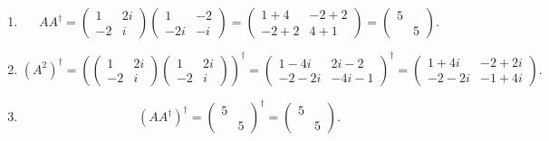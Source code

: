 \documentclass[11pt, letterpaper]{article}
\begin{document}
\begin{enumerate}
\[\begin{pmatrix}
			5 & -5i \\
			5i & 10
			\end{pmatrix}=\frac{1}{15} \begin{pmatrix}
			1 & -i \\
			i & 2
			\end{pmatrix}
		.\]
	\item 
		\[
			A A^{\dagger} =\begin{pmatrix}
			1 & 2i \\
			-2 & i
			\end{pmatrix}\begin{pmatrix}
			1 & -2 \\
			-2i & -i
			\end{pmatrix}=\begin{pmatrix}
			1+4 & -2+2 \\
			-2+2 & 4+1
			\end{pmatrix}=\begin{pmatrix}
			5 &  \\
			 & 5
			\end{pmatrix}
		.\]
	\item
		\[
			\left( A^2 \right) ^{\dagger} =\left( \begin{pmatrix}
			1 & 2i \\
			-2 & i
			\end{pmatrix}\begin{pmatrix}
			1 & 2i \\
			-2 & i
			\end{pmatrix} \right) ^{\dagger} =\begin{pmatrix}
			1-4i & 2i-2 \\
			-2-2i & -4i-1
			\end{pmatrix}^{\dagger} =\begin{pmatrix}
			1+4i & -2+2i \\
			-2-2i & -1+4i
			\end{pmatrix}
		.\]
	\item
		\[
			\left( A A^{\dagger}  \right) ^{\dagger} =\begin{pmatrix}
			5 &  \\
			 & 5
			\end{pmatrix}^{\dagger} =\begin{pmatrix}
			5 &  \\
			 & 5
			\end{pmatrix}
		.\]
\end{enumerate}
\end{document}
